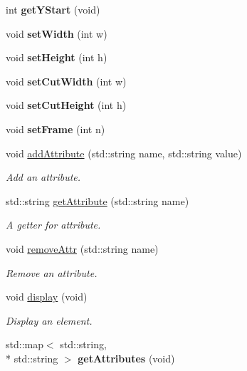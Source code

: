 \begin{DoxyCompactItemize}
\item 
\hypertarget{class_elements_a8c394148eb369b262ab60b5f4a59efec}{int {\bfseries get\+Y\+Start} (void)}\label{class_elements_a8c394148eb369b262ab60b5f4a59efec}

\item 
\hypertarget{class_elements_a16f6accfe5a20c996dae8154132e4bf7}{void {\bfseries set\+Width} (int w)}\label{class_elements_a16f6accfe5a20c996dae8154132e4bf7}

\item 
\hypertarget{class_elements_ad778acde74a8640958c6db2b7dd782bc}{void {\bfseries set\+Height} (int h)}\label{class_elements_ad778acde74a8640958c6db2b7dd782bc}

\item 
\hypertarget{class_elements_ad82fc7032101163c452a9469a095acab}{void {\bfseries set\+Cut\+Width} (int w)}\label{class_elements_ad82fc7032101163c452a9469a095acab}

\item 
\hypertarget{class_elements_a58ffc59bb3226e252ca50bdc67db46b5}{void {\bfseries set\+Cut\+Height} (int h)}\label{class_elements_a58ffc59bb3226e252ca50bdc67db46b5}

\item 
\hypertarget{class_elements_a9ba8c94a6f92d510d60b51239a42b67c}{void {\bfseries set\+Frame} (int n)}\label{class_elements_a9ba8c94a6f92d510d60b51239a42b67c}

\item 
void \hyperlink{class_elements_a4aac83563af945cf6c05af4e4d6a173b}{add\+Attribute} (std\+::string name, std\+::string value)
\begin{DoxyCompactList}\small\item\em Add an attribute. \end{DoxyCompactList}\item 
std\+::string \hyperlink{class_elements_ab35a8e49a075adca1dee3e941865e20f}{get\+Attribute} (std\+::string name)
\begin{DoxyCompactList}\small\item\em A getter for attribute. \end{DoxyCompactList}\item 
void \hyperlink{class_elements_ae549e0c8599f06b42126c67c5dd68fd2}{remove\+Attr} (std\+::string name)
\begin{DoxyCompactList}\small\item\em Remove an attribute. \end{DoxyCompactList}\item 
void \hyperlink{class_elements_adeca7401d8bc32fa75e2c2a0b2627412}{display} (void)
\begin{DoxyCompactList}\small\item\em Display an element. \end{DoxyCompactList}\item 
\hypertarget{class_elements_aff6b1b8c11e8579384461eadc63ee39e}{std\+::map$<$ std\+::string, \\*
std\+::string $>$ {\bfseries get\+Attributes} (void)}\label{class_elements_aff6b1b8c11e8579384461eadc63ee39e}


\end{DoxyCompactItemize}
